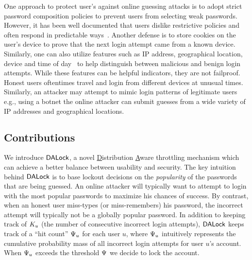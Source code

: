 One approach to protect user's against online guessing attacks is to adopt strict password composition policies to prevent users from selecting weak passwords. However, it has been well documented that users dislike restrictive policies and often respond in predictable ways~\cite{KSKMBCCE:SIGCHI11}. Another defense is to store cookies on the user's device to prove that the next login attempt came from a known device. Similarly, one can also utilize features such as IP address, geographical location, device and time of day~\cite{sandhu2005system,gordon2014efficiently,NDSS:FJDBG16} to help distinguish between malicious and benign login attempts. While these features can be helpful indicators, they are not failproof. Honest users oftentimes travel and login from different devices at unusual times. Similarly, an attacker may attempt to mimic login patterns of legitimate users e.g., using a botnet the online attacker can submit guesses from a wide variety of IP addresses and geographical locations. 


\vspace{-0.1cm}
\subsection{Contributions} 
We introduce $\mathsf{DALock}$, a novel \underline{D}istribution \underline{A}ware throttling mechanism which can achieve a better balance between usability and security. The key intuition behind $\mathsf{DALock}$ is to base lockout decisions on the {\em popularity} of the passwords that are being guessed. An online attacker will typically want to attempt to login with the most popular passwords to maximize his chances of success. By contrast, when an honest user miss-types (or miss-remembers) his password, the incorrect attempt will typically not be a globally popular password. In addition to keeping track of $K_{u}$ (the number of consecutive incorrect login attempts), $\mathsf{DALock}$ keeps track of a ``hit count'' $\Psi_{u}$ for each user $u$, where $\Psi_{u}$ intuitively represents the cumulative probability mass of all incorrect login attempts for user $u$'s account. When $\Psi_{u}$ exceeds the threshold $\Psi$ we decide to lock the account. 

